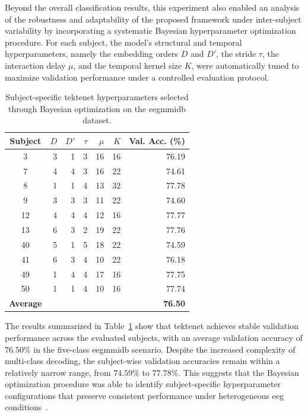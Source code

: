 Beyond the overall classification results, this experiment also enabled an analysis of the robustness and adaptability of the proposed framework under inter-subject variability by incorporating a systematic Bayesian hyperparameter optimization procedure. For each subject, the model's structural and temporal hyperparameters, namely the embedding orders $D$ and $D'$, the stride $\tau$, the interaction delay $\mu$, and the temporal kernel size $K$, were automatically tuned to maximize validation performance under a controlled evaluation protocol.

\begin{table}[htbp]
\centering
\caption{Subject-specific \gls{tektenet} hyperparameters selected through Bayesian optimization on the \gls{eegmmidb} dataset.}
\label{tab:hyperparameters_physionet}
\begin{tabular}{crrrrrr}
\toprule
\textbf{Subject} & \textbf{$D$} & \textbf{$D'$} & \textbf{$\tau$} & \textbf{$\mu$} & \textbf{$K$} & \textbf{Val. Acc. (\%)} \\
\midrule
3   & 3 & 1 & 3 & 16 & 16 & 76.19 \\
7   & 4 & 4 & 3 & 16 & 22 & 74.61 \\
8   & 1 & 1 & 4 & 13 & 32 & 77.78 \\
9   & 3 & 3 & 3 & 11 & 22 & 74.60 \\
12  & 4 & 4 & 4 & 12 & 16 & 77.77 \\
13  & 6 & 3 & 2 & 19 & 22 & 77.76 \\
40  & 5 & 1 & 5 & 18 & 22 & 74.59 \\
41  & 6 & 3 & 4 & 10 & 22 & 76.18 \\
49  & 1 & 4 & 4 & 17 & 16 & 77.75 \\
50  & 1 & 1 & 4 & 10 & 16 & 77.74 \\
\midrule
\textbf{Average} &  &  &  &  &  & \textbf{76.50} \\
\bottomrule
\end{tabular}
\end{table}
The results summarized in Table~\ref{tab:hyperparameters_physionet} show that \gls{tektenet} achieves stable validation performance across the evaluated subjects, with an average validation accuracy of $76.50\%$ in the five-class \gls{eegmmidb} scenario. Despite the increased complexity of multi-class decoding, the subject-wise validation accuracies remain within a relatively narrow range, from $74.59\%$ to $77.78\%$. This suggests that the Bayesian optimization procedure was able to identify subject-specific hyperparameter configurations that preserve consistent performance under heterogeneous \gls{eeg} conditions~\cite{snoek2012practical}.

